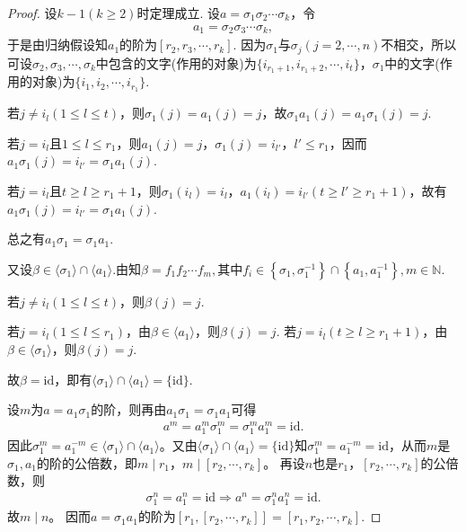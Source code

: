 \documentclass[../../main.tex]{subfiles}%
\begin{document}
\begin{proof}
设$k - 1(k \geqslant 2)$时定理成立. 设$a = \sigma_1 \sigma_2 \cdots \sigma_k$，令
\begin{align*}
a_1 = \sigma_2 \sigma_3 \cdots \sigma_k,
\end{align*}
于是由归纳假设知$a_1$的阶为$[r_2, r_3, \cdots, r_k]$. 因为$\sigma_1$与$\sigma_j(j=2,\cdots,n)$不相交，所以可设$\sigma_2, \sigma_3, \cdots, \sigma_k$中包含的文字(作用的对象)为$\{i_{r_1+1}, i_{r_1+2}, \cdots, i_t\}$，$\sigma_1$中的文字(作用的对象)为$\{i_1, i_2, \cdots, i_{r_1}\}$. 

若$j \neq i_l(1 \leqslant l \leqslant t)$，则$\sigma_1(j) = a_1(j) = j$，故$\sigma_1 a_1(j) = a_1 \sigma_1(j) = j$. 

若$j = i_l$且$1 \leqslant l \leqslant r_1$，则$a_1(j) = j$，$\sigma_1(j) = i_{l'}$，$l' \leqslant r_1$，因而$a_1 \sigma_1(j) = i_{l'} = \sigma_1 a_1(j)$.

若$j = i_l$且$t \geqslant l \geqslant r_1 + 1$，则$\sigma_1(i_l) = i_l$，$a_1(i_l) = i_{l'}(t \geqslant l' \geqslant r_1 + 1)$，故有$a_1 \sigma_1(j) = i_{l'} = \sigma_1 a_1(j)$. 

总之有$a_1 \sigma_1 = \sigma_1 a_1$. 

又设$\beta \in \langle \sigma_1 \rangle \cap \langle a_1 \rangle$.由知$\beta= f_1f_2\cdots f_m,\text{其中}f_i\in \left\{ \sigma _1,\sigma _{1}^{-1} \right\} \cap \left\{ a_1,a_{1}^{-1} \right\} ,m\in \mathbb{N}$. 

若$j \neq i_l(1 \leqslant l \leqslant t)$，则$\beta(j) = j$. 

若$j = i_l(1 \leqslant l \leqslant r_1)$，由$\beta \in \langle a_1 \rangle$，则$\beta(j) = j$. 若$j = i_l(t \geqslant l \geqslant r_1 + 1)$，由$\beta \in \langle \sigma_1 \rangle$，则$\beta(j) = j$.

故$\beta = \text{id}$，即有$\langle \sigma_1 \rangle \cap \langle a_1 \rangle = \{\text{id}\}$.

设$m$为$a=a_1\sigma_1$的阶，则再由$a_1\sigma_1=\sigma_1a_1$可得
\begin{align*}
a^m=a_1^m\sigma_1^m=\sigma_1^m a_1^m=\mathrm{id}.
\end{align*}
因此$\sigma_1^m=a_1^{-m}\in \langle \sigma_1\rangle \cap \langle a_1\rangle$。又由$\langle \sigma_1\rangle \cap \langle a_1\rangle =\{\mathrm{id}\}$知$\sigma_1^m=a_1^{-m}=\mathrm{id}$，从而$m$是$\sigma_1,a_1$的阶的公倍数，即$m\mid r_1$，$m\mid [r_2,\cdots,r_k]$。
再设$n$也是$r_1$，$[r_2,\cdots,r_k]$的公倍数，则
\begin{align*}
\sigma_1^n=a_1^n=\mathrm{id}\Longrightarrow a^n=\sigma_1^n a_1^n=\mathrm{id}.
\end{align*}
故$m\mid n$。
因而$a = \sigma_1 a_1$的阶为$[r_1, [r_2, \cdots, r_k]] = [r_1, r_2, \cdots, r_k]$.

\end{proof}
\end{document}
